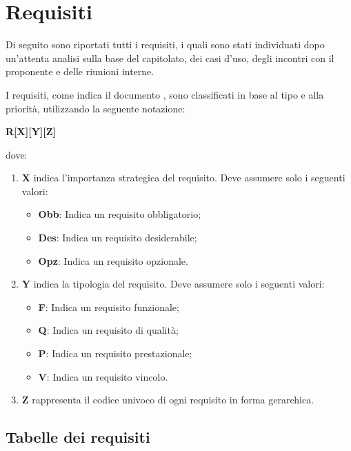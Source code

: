 \documentclass[../AnalisiDeiRequisiti.tex]{subfiles}
\begin{document}
\section{Requisiti}
Di seguito sono riportati tutti i requisiti, i quali sono stati individuati dopo un'attenta analisi sulla base del capitolato, dei casi d’uso, degli incontri con il proponente e delle riunioni interne.

I requisiti, come indica il documento \normediprogettov , sono classificati in base al tipo e alla priorità, utilizzando la seguente notazione:
\begin{center}\textbf{R[X][Y][Z]}\end{center} dove:
\begin{enumerate}
	\item \textbf{X} indica l'importanza strategica del requisito. Deve assumere solo i seguenti valori:
	\begin{itemize}
		\item \textbf{Obb}: Indica un requisito obbligatorio;
		\item \textbf{Des}: Indica un requisito desiderabile;
		\item \textbf{Opz}: Indica un requisito opzionale.
	\end{itemize}
	\item \textbf{Y} indica la tipologia del requisito. Deve assumere solo i seguenti valori:
	\begin{itemize}
		\item \textbf{F}: Indica un requisito funzionale;
		\item \textbf{Q}: Indica un requisito di qualità;
		\item \textbf{P}: Indica un requisito prestazionale;
		\item \textbf{V}: Indica un requisito vincolo.
	\end{itemize}
	\item \textbf{Z} rappresenta il codice univoco di ogni requisito in forma gerarchica.
\end{enumerate}
\subsection{Tabelle dei requisiti}
\end{document}
